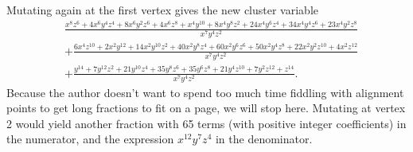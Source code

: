 \begin{example}
	Mutating again at the first vertex gives the new cluster variable
	\begin{align*}
		 & \frac{x^{8} z^{6} + 4 x^{6} y^{4} z^{4} + 8 x^{6} y^{2} z^{6} + 4 x^{6} z^{8} + x^{4} y^{10} + 8 x^{4} y^{8} z^{2} + 24 x^{4} y^{6} z^{4} + 34 x^{4} y^{4} z^{6} + 23 x^{4} y^{2} z^{8}}{x^7y^4z^2} \\&+ \frac{6 x^{4} z^{10} + 2 x^{2} y^{12} + 14 x^{2} y^{10} z^{2} + 40 x^{2} y^{8} z^{4} + 60 x^{2} y^{6} z^{6} + 50 x^{2} y^{4} z^{8} + 22 x^{2} y^{2} z^{10} + 4 x^{2} z^{12}}{x^7 y^4 z^2}\\ &+ \frac{y^{14} + 7 y^{12} z^{2} + 21 y^{10} z^{4} + 35 y^{8} z^{6} + 35 y^{6} z^{8} + 21 y^{4} z^{10} + 7 y^{2} z^{12} + z^{14}}{x^{7} y^{4} z^{2}}.
	\end{align*}
	Because the author doesn't want to spend too much time fiddling with alignment points
	to get long fractions to fit on a page, we will stop here. Mutating at vertex 2 would
	yield another fraction with 65 terms (with positive integer coefficients) in the
	numerator, and the expression $x^{12}y^7z^4$ in the denominator.
\end{example}

